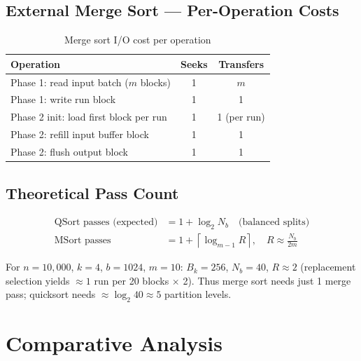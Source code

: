\documentclass[12pt,a4paper]{article}
\newcommand{\ceil}[1]{\left\lceil #1 \right\rceil}
\begin{document}
\subsection{External Merge Sort — Per-Operation Costs}

\begin{table}[H]
\centering
\caption{Merge sort I/O cost per operation}
\begin{tabular}{lcc}
\toprule
\textbf{Operation} & \textbf{Seeks} & \textbf{Transfers} \\
\midrule
Phase 1: read input batch ($m$ blocks) & 1 & $m$ \\
Phase 1: write run block & 1 & 1 \\
Phase 2 init: load first block per run & 1 & 1 (per run) \\
Phase 2: refill input buffer block & 1 & 1 \\
Phase 2: flush output block & 1 & 1 \\
\bottomrule
\end{tabular}
\end{table}

\subsection{Theoretical Pass Count}

\begin{align}
\text{QSort passes (expected)} &= 1 + \log_2 N_b \quad\text{(balanced splits)} \\
\text{MSort passes}            &= 1 + \ceil{\log_{m-1} R}, \quad R \approx \frac{N_b}{2m}
\end{align}

For $n = 10{,}000$, $k=4$, $b=1024$, $m=10$: $B_k = 256$, $N_b = 40$, $R \approx 2$
(replacement selection yields $\approx 1$ run per 20 blocks $\times$ 2). Thus
merge sort needs just 1 merge pass; quicksort needs $\approx \log_2 40 \approx 5$
partition levels.

\section{Comparative Analysis}
\end{document}
